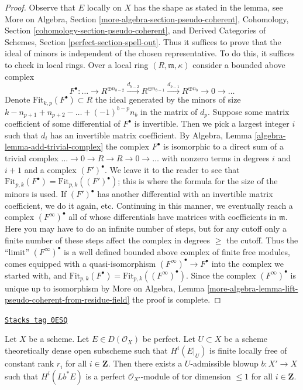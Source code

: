 \begin{proof}
Observe that $E$ locally on $X$ has the shape as stated in the lemma, see
More on Algebra, Section \ref{more-algebra-section-pseudo-coherent},
Cohomology, Section \ref{cohomology-section-pseudo-coherent}, and
Derived Categories of Schemes, Section \ref{perfect-section-spell-out}.
Thus it suffices to prove that the ideal of minors is independent
of the chosen representative. To do this, it suffices to check
in local rings. Over a local ring $(R, \mathfrak m, \kappa)$
consider a bounded above complex
$$
F^\bullet :
\ldots \to
R^{\oplus n_{b - 2}}
\xrightarrow{d_{b - 2}}
R^{\oplus n_{b - 1}}
\xrightarrow{d_{b - 1}}
R^{\oplus n_b} \to 0 \to \ldots
$$
Denote $\text{Fit}_{k, p}(F^\bullet) \subset R$ the ideal generated
by the minors of size $k - n_{p + 1} + n_{p + 2} - \ldots + (-1)^{b - p} n_b$
in the matrix of $d_p$. Suppose some matrix coefficient of some
differential of $F^\bullet$ is invertible. Then we pick a largest
integer $i$ such that $d_i$ has an invertible matrix coefficient.
By Algebra, Lemma \ref{algebra-lemma-add-trivial-complex}
the complex $F^\bullet$ is isomorphic to a direct sum of a trivial complex
$\ldots \to 0 \to R \to R \to 0 \to \ldots$ with nonzero terms
in degrees $i$ and $i + 1$ and a complex $(F')^\bullet$.
We leave it to the reader to see that
$\text{Fit}_{p, k}(F^\bullet) = \text{Fit}_{p, k}((F')^\bullet)$;
this is where the formula for the size of the minors is used.
If $(F')^\bullet$ has another differential with an invertible
matrix coefficient, we do it again, etc.
Continuing in this manner, we eventually reach a complex $(F^\infty)^\bullet$
all of whose differentials have matrices with coefficients
in $\mathfrak m$. Here you may have to do an infinite number
of steps, but for any cutoff only a finite number of these
steps affect the complex in degrees $\geq $ the cutoff.
Thus the ``limit'' $(F^\infty)^\bullet$ is a well defined bounded
above complex of finite free modules, comes equipped
with a quasi-isomorphism $(F^\infty)^\bullet \to F^\bullet$
into the complex we started with, and
$\text{Fit}_{p, k}(F^\bullet) = \text{Fit}_{p, k}((F^\infty)^\bullet)$.
Since the complex $(F^\infty)^\bullet$ is unique up to isomorphism by
More on Algebra, Lemma
\ref{more-algebra-lemma-lift-pseudo-coherent-from-residue-field}
the proof is complete.
\end{proof}

\begin{lemma}
\label{flat-lemma-blowup-complex}
\href{https://stacks.math.columbia.edu/tag/0ESQ}{\texttt{Stacks tag 0ESQ}}

Let $X$ be a scheme. Let $E \in D(\mathcal{O}_X)$ be perfect.
Let $U \subset X$ be a scheme theoretically dense open subscheme
such that $H^i(E|_U)$ is finite locally free of constant rank $r_i$
for all $i \in \mathbf{Z}$.
Then there exists a $U$-admissible blowup $b : X' \to X$ such that
$H^i(Lb^*E)$ is a perfect $\mathcal{O}_{X'}$-module
of tor dimension $\leq 1$ for all $i \in \mathbf{Z}$.
\end{lemma}

